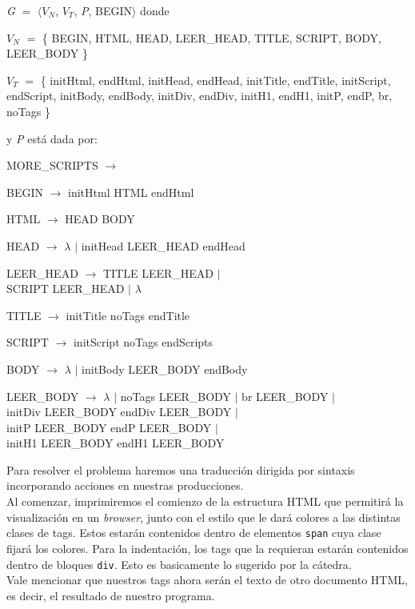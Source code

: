 \textit{G} $=$ $\langle${$V_N$, $V_T$, \textit{P}, BEGIN}$\rangle$ donde 

\indent $V_N$ $=$ \{ BEGIN, HTML, HEAD, LEER\_HEAD, TITLE, SCRIPT, BODY, LEER\_BODY \} 

\indent $V_T$ $=$ \{ initHtml, endHtml, initHead, endHead, initTitle, endTitle, initScript, endScript, initBody, endBody, initDiv, endDiv, initH1, endH1, initP, endP, br, noTags \}

\indent y \textit{P} est\'a dada por: 

  \begin{xlist}{MORE\_SCRIPTS $\longrightarrow$}
    \item[BEGIN $\longrightarrow$] initHtml HTML endHtml
    \item[HTML $\longrightarrow$] HEAD BODY
    \item[HEAD $\longrightarrow$] $\lambda$ $|$ initHead LEER\_HEAD endHead
    \item[LEER\_HEAD $\longrightarrow$] TITLE LEER\_HEAD $|$ \\ SCRIPT LEER\_HEAD $|$ $\lambda$
    \item[TITLE $\longrightarrow$] initTitle noTags endTitle
    \item[SCRIPT $\longrightarrow$] initScript noTags endScripts
    \item[BODY $\longrightarrow$] $\lambda$ $|$ initBody LEER\_BODY endBody
    \item[LEER\_BODY $\longrightarrow$] $\lambda$ $|$ noTags LEER\_BODY $|$ br LEER\_BODY $|$ \\ initDiv LEER\_BODY endDiv LEER\_BODY $|$ \\ initP LEER\_BODY endP LEER\_BODY $|$ \\ initH1 LEER\_BODY endH1 LEER\_BODY  
  \end{xlist}

\indent Para resolver el problema haremos una traducci\'on dirigida por sintaxis incorporando acciones en nuestras producciones.\\
\indent Al comenzar, imprimiremos el comienzo de la estructura HTML que permitir\'a la visualizaci\'on en un \textit{browser}, junto con el estilo que le dar\'a colores a las distintas clases de tags. Estos estar\'an contenidos dentro de elementos \texttt{span} cuya clase fijar\'a los colores. Para la indentaci\'on, los tags que la requieran estar\'an contenidos dentro de bloques \texttt{div}. Esto es basicamente lo sugerido por la c\'atedra.\\
\indent Vale mencionar que nuestros tags ahora ser\'an el texto de otro documento HTML, es decir, el resultado de nuestro programa.